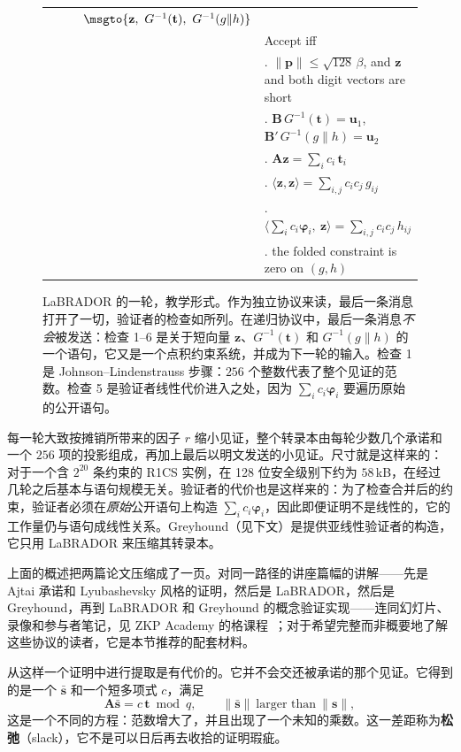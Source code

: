 \begin{figure}[H]
\begin{protocol}
\begin{tabular}{@{}p{0.34\linewidth}@{}p{0.26\linewidth}@{}p{0.40\linewidth}@{}}
 & \centering$\msgto{\mathbf{z},\ G^{-1}(\mathbf{t}),\ G^{-1}(g\|h)}$ & \\[0.3em]
 & & Accept iff \\
 & & \quad 1. $\|\mathbf{p}\|\le\sqrt{128}\,\beta$, and $\mathbf{z}$ and both digit vectors are short \\
 & & \quad 2. $\mathbf{B}\,G^{-1}(\mathbf{t})=\mathbf{u}_1$,\ $\mathbf{B}'\,G^{-1}(g\|h)=\mathbf{u}_2$ \\
 & & \quad 3. $\mathbf{A}\mathbf{z}=\sum_i c_i\,\mathbf{t}_i$ \\
 & & \quad 4. $\langle\mathbf{z},\mathbf{z}\rangle=\sum_{i,j}c_ic_j\,g_{ij}$ \\
 & & \quad 5. $\bigl\langle\sum_i c_i\boldsymbol{\varphi}_i,\ \mathbf{z}\bigr\rangle=\sum_{i,j}c_ic_j\,h_{ij}$ \\
 & & \quad 6. the folded constraint is zero on $(g,h)$ \\
\end{tabular}
\end{protocol}
\caption{LaBRADOR 的一轮，教学形式。作为独立协议来读，最后一条消息打开了一切，验证者的检查如所列。在递归协议中，最后一条消息\emph{不会}被发送：检查 1--6 是关于短向量 $\mathbf{z}$、$G^{-1}(\mathbf{t})$ 和 $G^{-1}(g\|h)$ 的一个语句，它又是一个点积约束系统，并成为下一轮的输入。检查 1 是 Johnson--Lindenstrauss 步骤：$256$ 个整数代表了整个见证的范数。检查 5 是验证者线性代价进入之处，因为 $\sum_ic_i\boldsymbol{\varphi}_i$ 要遍历原始的公开语句。}
\label{fig:labrador-round}
\end{figure}

每一轮大致按摊销所带来的因子 $r$ 缩小见证，整个转录本由每轮少数几个承诺和一个 $256$ 项的投影组成，再加上最后以明文发送的小见证。尺寸就是这样来的：对于一个含 $2^{20}$ 条约束的 R1CS 实例，在 128 位安全级别下约为 $58$\,kB，在经过几轮之后基本与语句规模无关。验证者的代价也是这样来的：为了检查合并后的约束，验证者必须在\emph{原始}公开语句上构造 $\sum_i c_i\boldsymbol{\varphi}_i$，因此即便证明不是线性的，它的工作量仍与语句成线性关系。Greyhound（见下文）是提供亚线性验证者的构造，它只用 LaBRADOR 来压缩其转录本。

上面的概述把两篇论文压缩成了一页。对同一路径的讲座篇幅的讲解——先是 Ajtai 承诺和 Lyubashevsky 风格的证明，然后是 LaBRADOR，然后是 Greyhound，再到 LaBRADOR 和 Greyhound 的概念验证实现——连同幻灯片、录像和参与者笔记，见 ZKP Academy 的格课程~\cite{zkpacademylattice}；对于希望完整而非概要地了解这些协议的读者，它是本节推荐的配套材料。

从这样一个证明中进行提取是有代价的。它并不会交还被承诺的那个见证。它得到的是一个 $\bar{\mathbf{s}}$ 和一个短多项式 $c$，满足
\[
  \mathbf{A}\bar{\mathbf{s}} = c\,\mathbf{t} \bmod q,
  \qquad \|\bar{\mathbf{s}}\| \ \text{larger than}\ \|\mathbf{s}\| ,
\]
这是一个不同的方程：范数增大了，并且出现了一个未知的乘数。这一差距称为\textbf{松弛}（slack），它不是可以日后再去收拾的证明瑕疵。


